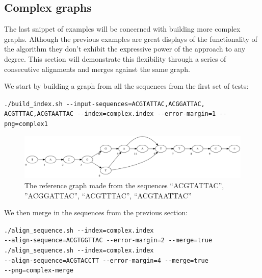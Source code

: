 \documentclass[thesis.tex]{subfiles}
\begin{document}
\subsection*{Complex graphs}
The last snippet of examples will be concerned with building more complex graphs. Although the previous examples are great displays of the functionality of the algorithm they don't exhibit the expressive power of the approach to any degree. This section will demonstrate this flexibility through a series of consecutive alignments and merges against the same graph.\\
\par\noindent
We start by building a graph from all the sequences from the first set of tests:\\
\par\noindent
\texttt{./build\_index.sh -{}-input-sequences=ACGTATTAC,ACGGATTAC,\\ACGTTTAC,ACGTAATTAC -{}-index=complex.index -{}-error-margin=1 -{}-png=complex1}\\
\par\noindent
\begin{figure}[!h]
  \begin{mdframed}
  \includegraphics[width=\textwidth]{output/complex1.png}
  \caption{The reference graph made from the sequences ``ACGTATTAC'', ''ACGGATTAC'', ``ACGTTTAC'', ``ACGTAATTAC''}
  \label{fig:validation_complex_ref}
  \end{mdframed}
\end{figure}
We then merge in the sequences from the previous section:\\
\par\noindent
\texttt{./align\_sequence.sh -{}-index=complex.index \\
-{}-align-sequence=ACGTGGTTAC -{}-error-margin=2 -{}-merge=true}\\
\texttt{./align\_sequence.sh -{}-index=complex.index \\
-{}-align-sequence=ACGTACCTT -{}-error-margin=4 -{}-merge=true \\
-{}-png=complex-merge}\\
\end{document}

